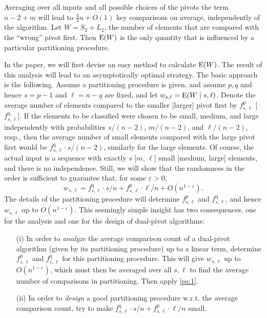 \documentclass[prodmode,acmtalg]{acmsmall}
\newcommand{\E}{\textnormal{\textrm{E}}}
\begin{document}
Averaging over all inputs and all possible choices of the pivots 
the term $n-2 + m$ will lead to $\frac43n + O(1)$ key comparisons on average,
independently of the algorithm. 
Let $W = S_2 +L_2$,
the number of elements that are compared with the ``wrong'' pivot first.
Then $\E(W)$ is the only quantity that is influenced by a particular partitioning procedure.


In the paper, we will first devise an easy method to calculate $\E(W)$. 
The result of this analysis will lead to an asymptotically optimal strategy.
The basic approach is the following. Assume a partitioning procedure is given, and 
assume $p,q$ and hence $s=p-1$ and $\ell=n-q$ are fixed, 
and let $w_{s,\ell} = \E(W \mid s,\ell)$.
Denote the average number of elements compared to the smaller [larger] pivot first by $f^\text{p}_{s,\ell}$ [$f^\text{q}_{s,\ell}$].
If the elements to be classified were chosen to be small, medium, and large independently
with probabilities $s/(n-2)$, $m/(n-2)$, and $\ell/(n-2)$, resp., then the
average number of 
small elements compared with the large pivot first would be $f^\text{q}_{s,\ell} \cdot s/(n-2)$,
similarly for the large elements. 
Of course, the actual input is a sequence with exactly $s$ [$m$, $\ell$] small [medium, large] elements, and there is no independence. 
Still, we will show that the randomness in the order is sufficient to guarantee that, for some $\varepsilon > 0$,
\begin{equation}
w_{s,\ell} = f^\text{q}_{s,\ell} \cdot s/n + f^\text{p}_{s,\ell} \cdot \ell/n + O(n^{1 - \varepsilon}).
\label{eq:small:large:200}
\end{equation}
The details of the partitioning procedure will determine $f^\text{p}_{s,\ell}$ and $f^\text{q}_{s,\ell}$, and hence
$w_{s,\ell}$ up to $O(n^{1 - \varepsilon})$.
This seemingly simple insight has two consequences, one for the analysis and one for the design of dual-pivot algorithms: 
\begin{itemize}
	\item[(i)] In order to \emph{analyze} the average comparison count of a
	    dual-pivot algorithm (given by its partitioning procedure) up to a linear term,
	determine $f^\text{p}_{s,\ell}$ and $f^\text{q}_{s,\ell}$ for this partitioning procedure. This will give
    $w_{s,\ell}$ up to $O(n^{1-\varepsilon})$, which must then be averaged over all $s,\ell$ to find the
	average number of comparisons in partitioning. Then apply \eqref{eq:1}.
	\item[(ii)] In order to \emph{design} a good partitioning procedure w.r.t.
	    the average comparison count, try to
	    make $f^\text{q}_{s,\ell} \cdot s/n + f^\text{p}_{s,\ell} \cdot \ell/n$ small.
\end{itemize}
\end{document}
